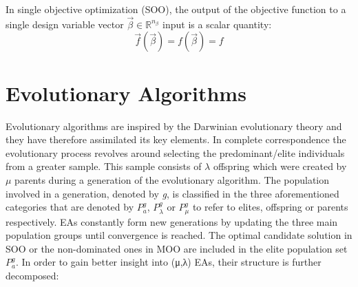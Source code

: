In single objective optimization (SOO), the output of the 
objective function to a single design variable vector 
$\vec{β} \in \mathbb{R}^{n_{β}}$ input is a scalar quantity:
\begin{equation}
\vec{f}(\vec{β}) = f(\vec{β}) = f
\end{equation} 



\newpage 


\section{Evolutionary Algorithms}\label{section:EAs}
Evolutionary algorithms are inspired by the Darwinian 
evolutionary theory and they have therefore assimilated 
its key elements. In complete correspondence the evolutionary 
process revolves around selecting the predominant/elite 
individuals from a greater sample. This sample consists
of $λ$ offspring which were created by $μ$ parents during a
generation of the evolutionary algorithm. The population involved 
in a generation, denoted by \textit{g}, is classified in the three 
aforementioned categories that are denoted by $P_{a}^g$, $P_{λ}^g$ 
or $P_{μ}^g$ to refer to elites, offspring or parents respectively. 
EAs constantly form new generations by updating the three main 
population groups until convergence is reached. The optimal 
candidate solution in SOO or the non-dominated ones in MOO are 
included in the elite population set $P_{a}^g$. In order to gain 
better insight into (μ,λ) ΕΑs, their structure is further 
decomposed\cite{EAs}:  

